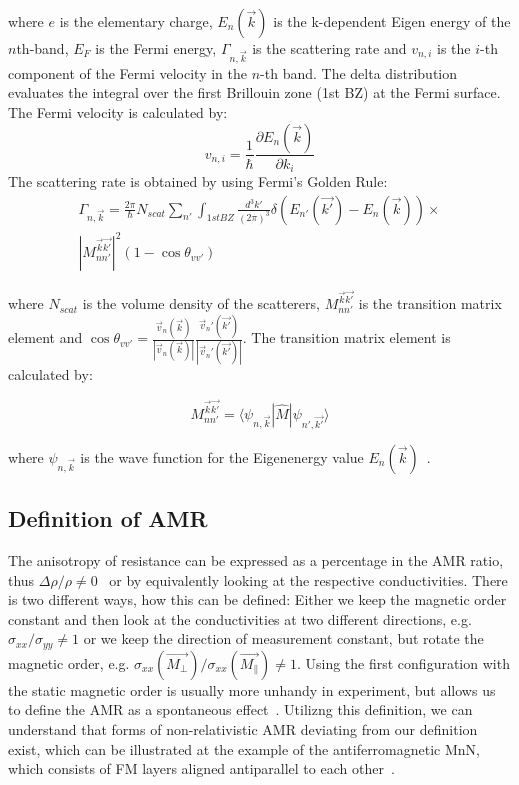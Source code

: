\documentclass[prb,showpacs,amsmath,amssymb,superscriptaddress,twocolumn,floatfix]{revtex4-1}
\begin{document}
where $e$ is the elementary charge, $E_n(\vec{k})$ is the k-dependent Eigen energy of the $n$th-band, $E_F$ is the Fermi energy, $\Gamma_{n, \vec{k}}$ is the scattering rate and $v_{n,i}$ is the $i$-th component of the Fermi velocity in the $n$-th band. The delta distribution evaluates the integral over the first Brillouin zone (1st BZ) at the Fermi surface. The Fermi velocity is calculated by:
%
\begin{equation}
v_{n, i} = \frac{1}{\hbar} \frac{\partial E_n(\vec{k})}{\partial k_i}
\end{equation}
%
The scattering rate is obtained by using Fermi's Golden Rule:
%
\begin{multline}
	\Gamma_{n, \vec{k}} = \frac{2 \pi}{\hbar} N_{scat} \sum_{n'}  \int_ {1st BZ} \frac{d^3k'}{(2\pi)^3} \delta(E_{n'}(\vec{k'}) - E_n(\vec{k})) \times \\ |M^{\vec{k}\vec{k'}}_{nn'} |^2 (1 - \cos \theta_{vv'})
	\label{eq_FermiGoldenRule_1}
\end{multline}

where $N_{scat}$ is the volume density of the scatterers, $M^{\vec{k}\vec{k'}}_{nn'}$ is the transition matrix element and $\cos \theta_{vv'} = \frac{\vec{v}_n (\vec{k})}{|\vec{v}_n (\vec{k})|}\frac{\vec{v}_n' (\vec{k'})}{|\vec{v}_n' (\vec{k'})|}$. The transition matrix element is calculated by:

\begin{equation}
	M^{\vec{k}\vec{k'}}_{nn'} = \langle \psi_{n, \vec{k}}|\hat{M}|\psi_{n', \vec{k'}} \rangle
	\label{eq_transmatrix}
\end{equation}

where $\psi_{n, \vec{k}}$ is the wave function for the Eigenenergy value $E_n(\vec{k})$~\cite{Vyborny:2009}. 

\subsection{Definition of AMR}

The anisotropy of resistance can be expressed as a percentage in the AMR ratio, thus $\Delta \rho / \rho \neq 0$~\cite{Ritzinger:2023} or by equivalently looking at the respective conductivities. There is two different ways, how this can be defined: Either we keep the magnetic order constant and then look at the conductivities at two different directions, e.g. $\sigma_{xx} / \sigma_{yy} \neq 1$ or we keep the direction of measurement constant, but rotate the magnetic order, e.g. $\sigma_{xx} (\vec{M_\perp})  / \sigma_{xx} (\vec{M_\parallel}) \neq 1$. Using the first configuration with the static magnetic order is usually more unhandy in experiment, but allows us to define the AMR as a spontaneous effect~\cite{Bakonyi:2022}. Utilizng this definition, we can understand that forms of non-relativistic AMR deviating from our definition exist, which can be illustrated at the example of the antiferromagnetic MnN, which consists of FM layers aligned antiparallel to each other~\cite{Dunz:2020}.
\end{document}

